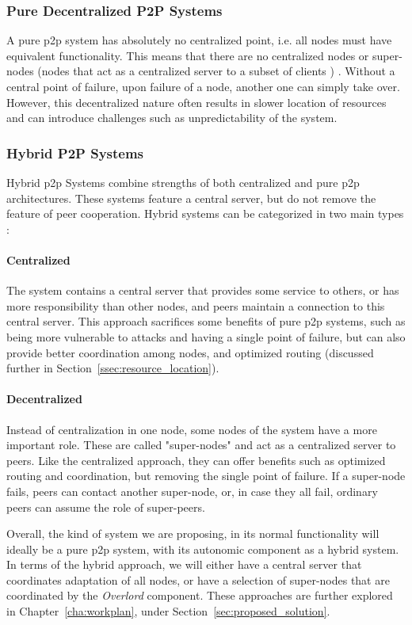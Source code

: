 \subsubsection{Pure Decentralized P2P Systems}
\label{sssec:pure_decentralized_p2p_systems}
\par A pure \gls{p2p} system has absolutely no centralized point, i.e. all nodes must have equivalent functionality. This means that there are no centralized nodes or super-nodes (nodes that act
as a centralized server to a subset of clients \cite{Yang2003}) \cite{Pourebrahimi2005}. Without a central point of failure, upon failure of a node, another one can simply take over. However, this decentralized nature often results in slower location of resources and can introduce challenges such as unpredictability of the system.
%
%
%
\subsubsection{Hybrid P2P Systems}
\label{sssec:hybrid_p2p_systems}
\par Hybrid \gls{p2p} Systems combine strengths of both centralized and pure \gls{p2p} architectures. These systems feature a central server, but do not remove the feature of peer cooperation. Hybrid systems can be categorized in two main types \cite{Pourebrahimi2005}:
\paragraph{Centralized} The system contains a central server that provides some service to others, or has more responsibility than other nodes, and peers maintain a connection to this central server. This approach sacrifices some benefits of pure \gls{p2p} systems, such as being more vulnerable to attacks and having a single point of failure, but can also provide better coordination among nodes, and optimized routing (discussed further in Section~\ref{ssec:resource_location}).
\paragraph{Decentralized} Instead of centralization in one node, some nodes of the system have a more important role. These are called "super-nodes" and act as a centralized server to peers. Like the centralized approach, they can offer benefits such as optimized routing and coordination, but removing the single point of failure. If a super-node fails, peers can contact another super-node, or, in case they all fail, ordinary peers can assume the role of super-peers.
\par Overall, the kind of system we are proposing, in its normal functionality will ideally be a pure \gls{p2p} system, with its autonomic component as a hybrid system. In terms of the hybrid approach, we will either have a central server that coordinates adaptation of all nodes, or have a selection of super-nodes that are coordinated by the \textit{Overlord} component. These approaches are further explored in Chapter~\ref{cha:workplan}, under Section~\ref{sec:proposed_solution}. %
%
%
